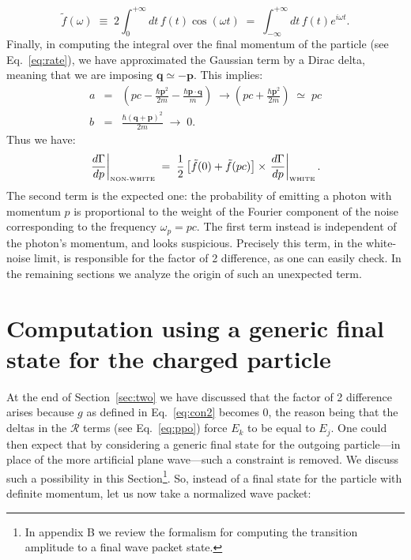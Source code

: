 \documentclass[12pt,onecolumn,amssymb,nofootinbib]{revtex4-2} %
\begin{document}
\begin{equation} \label{eq:gdskteyfdah}
\tilde{f}(\omega) \; \equiv \; 2\int_{0}^{+\infty} dt\, f(t) \cos(\omega t) \;
= \; \int_{-\infty}^{+\infty} dt\, f(t) e^{i \omega t}.
\end{equation}
Finally, in computing the integral over the final momentum of the particle (see
Eq.~\eqref{eq:rate}), we have approximated the Gaussian term by a Dirac
delta, meaning that we are imposing $\mathbf{q} \simeq - \mathbf{p}$. This
implies:
\begin{eqnarray}
a & = & \left( pc - \frac{\hbar \mathbf{p}^2}{2m} - \frac{\hbar \mathbf{p} \cdot
\mathbf{q}}{m} \right) \; \longrightarrow \left(pc + \frac{\hbar \mathbf{p}^2}{2m}
\right) \; \simeq \; pc \label{eq:gsddsfsd}\\
b & = & \frac{\hbar(\mathbf{q+p})^{2}}{2m} \; \longrightarrow \; 0.
\end{eqnarray}
Thus we have:
\begin{equation}
\left. \frac{d \Gamma}{dp} \right|_{\text{\tiny NON-WHITE}} \; = \; \frac{1}{2}
\left[ \tilde{f}(0) + \tilde{f}(pc) \right]
\times \left. \frac{d \Gamma}{dp} \right|_{\text{\tiny WHITE}}.
\end{equation}
The second term is the expected one: the probability of emitting a photon with momentum $p$ is proportional to the weight of the Fourier component of the noise corresponding to the frequency $\omega_p = pc$. The first term instead is independent of the photon's momentum, and looks suspicious. Precisely this term, in the white-noise limit, is responsible for the factor of 2 difference, as one can easily check. In the remaining sections we analyze the origin of such an unexpected term.


\section{Computation using a generic final state for the charged particle}

At the end of Section~\ref{sec:two} we have discussed that the factor of 2 difference arises because $g$ as defined in Eq.~\eqref{eq:con2} becomes 0, the reason being that the deltas in the ${\mathcal R}$ terms (see Eq.~\eqref{eq:ppo}) force $E_k$ to be equal to $E_j$. One could then expect that by considering a generic final state for the outgoing particle---in place of the more artificial plane wave---such a constraint is removed. We discuss such a possibility in this Section\footnote{In appendix B we review the formalism for computing the transition amplitude to a final wave packet state.}. So, instead of a final state for the particle with definite momentum, let us now take a normalized wave packet:
\end{document}
